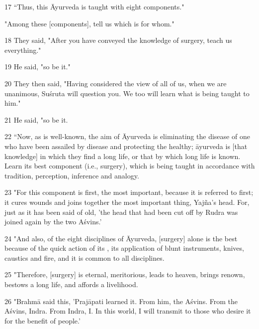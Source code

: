 \begin{translation}
    \item[17] “Thus, this Āyurveda is taught with eight components."
    
    "Among these [components], tell us which is for whom."
    
    \item[18] They said, "After you have conveyed the knowledge of surgery, 
    teach 
    us everything."
    
    \item[19] He said, "so be it."
    
    \item[20] They then said, "Having considered the view of all of us, when we 
    are 
    unanimous, Suśruta will question you. We too will learn what is being taught to 
    him."
    
    \item[21] He said, "so be it.
    
    \item[22] “Now, as is well-known, the aim of Āyurveda is eliminating the 
    disease of one who have been assailed by disease and protecting the healthy;  
    āyurveda is [that knowledge] in which they find a long life, or that by which 
    long life is known. Learn its best component (i.e., surgery), which is being 
    taught in accordance with tradition, perception, inference and analogy.
    
    \item[23] "For this component is first, the most important, because it is 
    referred to first; it cures wounds and joins together the most important thing, 
    Yajña's head. For, just as it has been said of old, 'the head that had been cut off 
    by Rudra was joined again by the two Aśvins.'
    
    \item[24] "And also, of the eight disciplines of Āyurveda, [surgery] alone is 
    the best because of the quick action of its , its 
    application of blunt 
    instruments, knives, caustics and fire, and it is common to all disciplines.
    
    \item[25] "Therefore, [surgery] is eternal, meritorious, leads to heaven, 
    brings renown, bestows a long life, and affords a livelihood.
    
    \item[26] "Brahmā said this, 'Prajāpati learned it. From him, the Aśvins. From 
    the Aśvins, 
    Indra. From Indra, I. In this world, I will transmit to those who desire it for the benefit of 
    people.' 
    

\end{translation}
